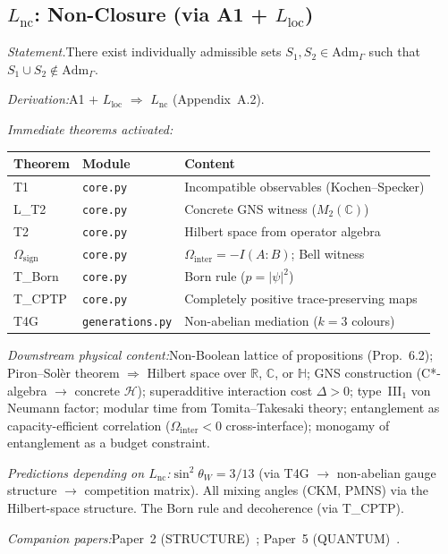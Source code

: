 \documentclass[11pt]{article}
\newcommand{\Adm}{\mathrm{Adm}}
\newcommand{\sw}{\sin^2\!\theta_W}
\newcommand{\Lnc}{L_{\mathrm{nc}}}
\newcommand{\Lloc}{L_{\mathrm{loc}}}
\begin{document}
\subsection{\texorpdfstring{$L_{\mathrm{nc}}$}{Lnc}: Non-Closure (via A1 + \texorpdfstring{$L_{\mathrm{loc}}$}{Lloc})}

\begin{tcolorbox}[apfbox, title={$\Lnc$ $\longrightarrow$ Quantum Mechanics}]
\textit{Statement.}\quad There exist individually admissible sets $S_1, S_2 \in \Adm_\Gamma$ such that $S_1 \cup S_2 \notin \Adm_\Gamma$.

\textit{Derivation:}\quad A1 $+$ $\Lloc$ $\Rightarrow$ $\Lnc$ (Appendix~A.2).

\smallskip\noindent\textit{Immediate theorems activated:}
\begin{center}
\small
\renewcommand{\arraystretch}{1.15}
\begin{tabular}{lll}
\toprule
\textbf{Theorem} & \textbf{Module} & \textbf{Content} \\
\midrule
T1 & \texttt{core.py} & Incompatible observables (Kochen--Specker) \\
L\_T2 & \texttt{core.py} & Concrete GNS witness ($M_2(\mathbb{C})$) \\
T2 & \texttt{core.py} & Hilbert space from operator algebra \\
$\Omega_{\mathrm{sign}}$ & \texttt{core.py} & $\Omega_{\mathrm{inter}} = -I(A{:}B)$; Bell witness \\
T\_Born & \texttt{core.py} & Born rule ($p = |\psi|^2$) \\
T\_CPTP & \texttt{core.py} & Completely positive trace-preserving maps \\
T4G & \texttt{generations.py} & Non-abelian mediation ($k = 3$ colours) \\
\bottomrule
\end{tabular}
\end{center}

\smallskip\noindent\textit{Downstream physical content:}\quad Non-Boolean lattice of propositions (Prop.~6.2); Piron--Sol\`er theorem $\Rightarrow$ Hilbert space over $\mathbb{R}$, $\mathbb{C}$, or $\mathbb{H}$; GNS construction (C*-algebra $\to$ concrete $\mathcal{H}$); superadditive interaction cost $\Delta > 0$; type~III${}_1$ von Neumann factor; modular time from Tomita--Takesaki theory; entanglement as capacity-efficient correlation ($\Omega_{\mathrm{inter}} < 0$ cross-interface); monogamy of entanglement as a budget constraint.

\smallskip\noindent\textit{Predictions depending on $\Lnc$:}\quad $\sw = 3/13$ (via T4G $\to$ non-abelian gauge structure $\to$ competition matrix).  All mixing angles (CKM, PMNS) via the Hilbert-space structure.  The Born rule and decoherence (via T\_CPTP).

\smallskip\noindent\textit{Companion papers:}\quad Paper~2 (STRUCTURE)~\cite{P2}; Paper~5 (QUANTUM)~\cite{P5}.
\end{tcolorbox}
\end{document}
